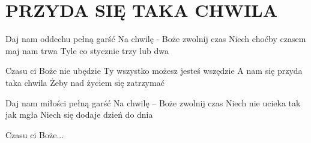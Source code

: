 \documentclass[../../../songbook.tex]{subfiles}
\begin{document}
\TabPositions{8cm} %
\section*{PRZYDA SIĘ TAKA CHWILA}
{}
\vspace{0.5cm}
Daj nam oddechu pełną garść		 \newline	
Na chwilę - Boże zwolnij czas 		 \newline	
Niech choćby czasem maj nam trwa	 \newline	
Tyle co stycznie trzy lub dwa	 \newline	
 
\-\hspace{1cm} Czasu ci Boże nie ubędzie			 \newline	
\-\hspace{1cm} Ty wszystko możesz jesteś wszędzie	 \newline	
\-\hspace{1cm} A nam się przyda taka chwila			 \newline	
\-\hspace{1cm} Żeby nad życiem się zatrzymać		 \newline	
 
Daj nam miłości pełną garść \newline	
Na chwilę – Boże zwolnij czas \newline	
Niech nie ucieka tak jak mgła \newline	
Niech się dodaje dzień do dnia \newline	

\-\hspace{1cm} Czasu ci Boże... \newline	
\end{document}
